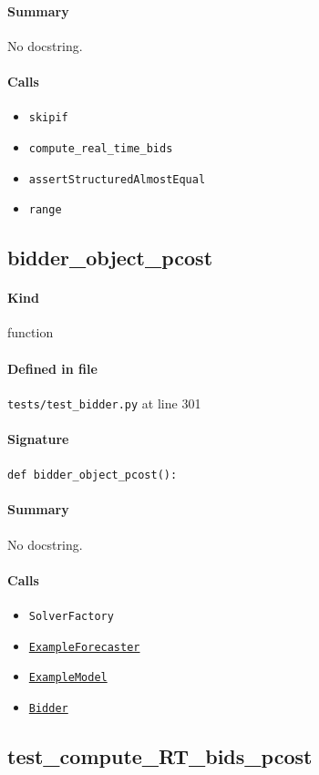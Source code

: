 \documentclass[11pt]{report}
\begin{document}
\paragraph{Summary} No docstring.
\paragraph{Calls}
\begin{itemize}[leftmargin=*]
  \item \texttt{skipif}
  \item \texttt{compute\_real\_time\_bids}
  \item \texttt{assertStructuredAlmostEqual}
  \item \texttt{range}
\end{itemize}
\subsection{bidder\_object\_pcost}
\label{def:tests-test_bidder.py:bidder_object_pcost:L301}
\paragraph{Kind} function
\paragraph{Defined in file} \texttt{tests/test\_bidder.py} at line 301
\paragraph{Signature} \texttt{def bidder\_object\_pcost():}
\paragraph{Summary} No docstring.
\paragraph{Calls}
\begin{itemize}[leftmargin=*]
  \item \texttt{SolverFactory}
  \item \hyperref[def:tests-util.py:ExampleForecaster:L259]{\texttt{ExampleForecaster}}
  \item \hyperref[def:tests-util.py:ExampleModel:L25]{\texttt{ExampleModel}}
  \item \hyperref[def:bidder.py:Bidder:L1000]{\texttt{Bidder}}
\end{itemize}
\subsection{test\_compute\_RT\_bids\_pcost}
\label{def:tests-test_bidder.py:test_compute_RT_bids_pcost:L324}
\end{document}
